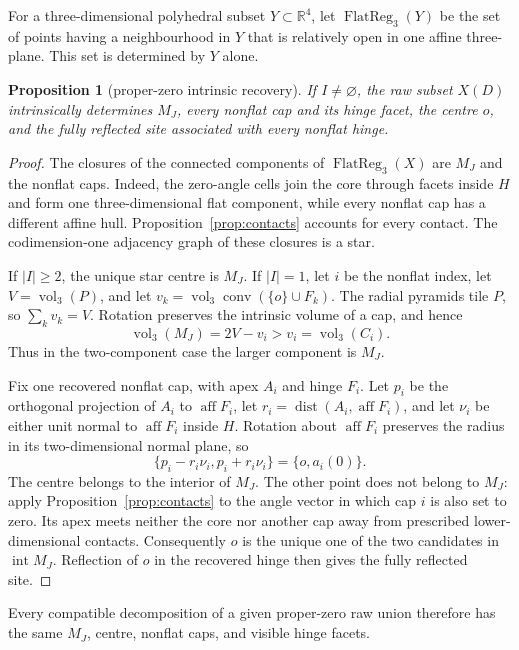 \documentclass[11pt]{amsart}
\newtheorem{proposition}[theorem]{Proposition}
\theoremstyle{definition}
\newcommand{\R}{\mathbb{R}}
\newcommand{\conv}{\operatorname{conv}}
\newcommand{\aff}{\operatorname{aff}}
\newcommand{\vol}{\operatorname{vol}}
\newcommand{\dist}{\operatorname{dist}}
\begin{document}
For a three-dimensional polyhedral subset $Y\subset\R^4$, let
$\operatorname{FlatReg}_3(Y)$ be the set of points having a neighbourhood in
$Y$ that is relatively open in one affine three-plane.  This set is determined
by $Y$ alone.

\begin{proposition}[proper-zero intrinsic recovery]
\label{prop:intrinsic-recovery}
If $I\ne\varnothing$, the raw subset $X(D)$ intrinsically determines $M_J$,
every nonflat cap and its hinge facet, the centre $o$, and the fully reflected
site associated with every nonflat hinge.
\end{proposition}

\begin{proof}
The closures of the connected components of
$\operatorname{FlatReg}_3(X)$ are $M_J$ and the nonflat caps.  Indeed, the
zero-angle cells join the core through facets inside $H$ and form one
three-dimensional flat component, while every nonflat cap has a different
affine hull.  Proposition~\ref{prop:contacts} accounts for every contact.
The codimension-one adjacency graph of these closures is a star.

If $|I|\ge2$, the unique star centre is $M_J$.  If $|I|=1$, let $i$ be the
nonflat index, let $V=\vol_3(P)$, and let
$v_k=\vol_3\conv(\{o\}\cup F_k)$.  The radial pyramids tile $P$, so
$\sum_kv_k=V$.  Rotation preserves the intrinsic volume of a cap, and hence
\[
 \vol_3(M_J)=2V-v_i>v_i=\vol_3(C_i).
\]
Thus in the two-component case the larger component is $M_J$.

Fix one recovered nonflat cap, with apex $A_i$ and hinge $F_i$.  Let $p_i$ be
the orthogonal projection of $A_i$ to $\aff F_i$, let
$r_i=\dist(A_i,\aff F_i)$, and let $\nu_i$ be either unit normal to
$\aff F_i$ inside $H$.  Rotation about $\aff F_i$ preserves the radius in its
two-dimensional normal plane, so
\[
 \{p_i-r_i\nu_i,p_i+r_i\nu_i\}=\{o,a_i(0)\}.
\]
The centre belongs to the interior of $M_J$.  The other point does not belong
to $M_J$: apply Proposition~\ref{prop:contacts} to the angle vector in
which cap $i$ is also set to zero.  Its apex meets neither the core nor another
cap away from prescribed lower-dimensional contacts.  Consequently $o$ is the
unique one of the two candidates in $\operatorname{int}M_J$.  Reflection of
$o$ in the recovered hinge then gives the fully reflected site.
\end{proof}

Every compatible decomposition of a given proper-zero raw union therefore has
the same $M_J$, centre, nonflat caps, and visible hinge facets.
\end{document}
